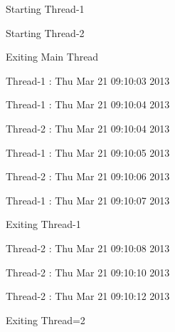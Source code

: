 \documentclass [12pt,a4paper,notitlepage,oneside,bahasa]{article}
\begin{document}
\par
\noindent 
{\fontsize{10pt}{10pt}\selectfont Starting Thread-1} \par
\noindent 
{\fontsize{10pt}{10pt}\selectfont Starting Thread-2} \par
\noindent 
{\fontsize{10pt}{10pt}\selectfont Exiting Main Thread} \par
\noindent 
{\fontsize{10pt}{10pt}\selectfont Thread-1 : Thu Mar 21 09:10:03 2013} \par
\noindent 
{\fontsize{10pt}{10pt}\selectfont Thread-1 : Thu Mar 21 09:10:04 2013} \par
\noindent 
{\fontsize{10pt}{10pt}\selectfont Thread-2 : Thu Mar 21 09:10:04 2013} \par
\noindent 
{\fontsize{10pt}{10pt}\selectfont Thread-1 : Thu Mar 21 09:10:05 2013} \par
\noindent 
{\fontsize{10pt}{10pt}\selectfont Thread-2 : Thu Mar 21 09:10:06 2013} \par
\noindent 
{\fontsize{10pt}{10pt}\selectfont Thread-1 : Thu Mar 21 09:10:07 2013} \par
\noindent 
{\fontsize{10pt}{10pt}\selectfont Exiting Thread-1} \par
\noindent 
{\fontsize{10pt}{10pt}\selectfont Thread-2 : Thu Mar 21 09:10:08 2013} \par
\noindent 
{\fontsize{10pt}{10pt}\selectfont Thread-2 : Thu Mar 21 09:10:10 2013} \par
\noindent 
{\fontsize{10pt}{10pt}\selectfont Thread-2 : Thu Mar 21 09:10:12 2013} \par
\noindent 
{\fontsize{10pt}{10pt}\selectfont Exiting Thread=2} \par

\vspace{10pt}
\end{document}
